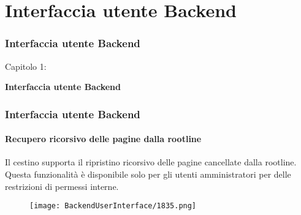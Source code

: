 %

\section{Interfaccia utente Backend}
\begin{frame}[fragile]
	\frametitle{Interfaccia utente Backend}

	\begin{center}\huge{Capitolo 1:}\end{center}
	\begin{center}\huge{\color{typo3darkgrey}\textbf{Interfaccia utente Backend}}\end{center}

\end{frame}

\begin{frame}[fragile]
	\frametitle{Interfaccia utente Backend}
	\framesubtitle{Recupero ricorsivo delle pagine dalla rootline}

	Il cestino supporta il ripristino ricorsivo delle pagine cancellate dalla rootline.
	Questa funzionalità è disponibile solo per gli utenti amministratori per delle restrizioni di permessi interne.

	\begin{figure}
		\texttt{[image: BackendUserInterface/1835.png]}
	\end{figure}

\end{frame}

